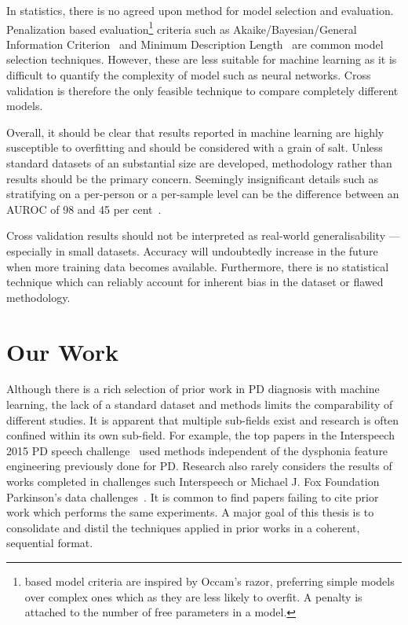 \documentclass[12pt, twoside]{book}
\renewcommand\emph[1]{\textit{\color{USred}{#1}}}
\begin{document}
In statistics, there is no agreed upon method for model selection and evaluation. Penalization based evaluation\footnote{\emph{Penalization} based model criteria are inspired by Occam's razor, preferring simple models over complex ones which as they are less likely to overfit. A penalty is attached to the number of free parameters in a model.}  criteria such as Akaike/Bayesian/General Information Criterion~\cite{aicbic,generalinfocriteriongic} and Minimum Description Length~\cite{mindescriptionlength} are common model selection techniques. However, these are less suitable for machine learning as it is difficult to quantify the complexity of model such as neural networks. Cross validation is therefore the only feasible technique to compare completely different models. 
 

Overall, it should be clear that results reported in machine learning are highly susceptible to overfitting and should be considered with a grain of salt. Unless standard datasets of an substantial size are developed, methodology rather than results should be the primary concern. Seemingly insignificant details such as stratifying on a per-person or a per-sample level can be the difference between an AUROC of 98 and 45 per cent~\cite{mpowerneto2017analysis}. 

Cross validation results should not be interpreted as real-world generalisability --- especially in small datasets. Accuracy will undoubtedly increase in the future when more training data becomes available. Furthermore, there is no statistical technique which can reliably account for inherent bias in the dataset or flawed methodology.





\chapter{Our Work}
\label{ourwork}
\vspace*{-1em}
Although there is a rich selection of prior work in PD diagnosis with machine learning, the lack of a standard dataset and methods limits the comparability of different studies. It is apparent that multiple sub-fields exist and research is often confined within its own sub-field. For example, the top papers in the Interspeech 2015 PD speech challenge~\cite{compareis15pd} used methods independent of the dysphonia feature engineering previously done for PD. Research also rarely considers the results of works completed in challenges such Interspeech or Michael J. Fox Foundation Parkinson's data challenges~\cite{mjfoxchallenge2013}. It is common to find papers failing to cite prior work which performs the same experiments. A major goal of this thesis is to consolidate and distil the techniques applied in prior works in a coherent, sequential format.
\end{document}
